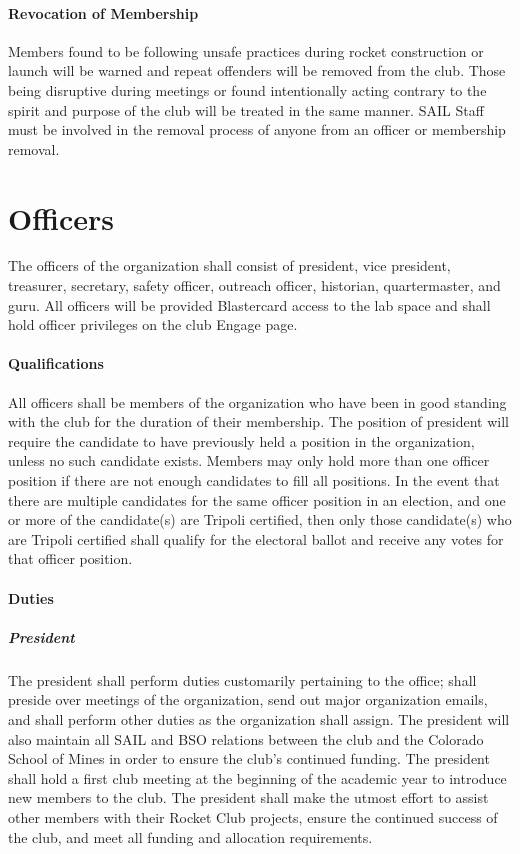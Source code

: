 \documentclass[12pt]{article}
\begin{document}
\paragraph{Revocation of Membership}
Members found to be following unsafe practices during rocket construction or launch will be warned and repeat offenders will be removed from the club.  
Those being disruptive during meetings or found intentionally acting contrary to the spirit and purpose of the club will be treated in the same manner. 
SAIL Staff must be involved in the removal process of anyone from an officer or membership removal.


\section{Officers}
\label{officers}
The officers of the organization shall consist of president, 
vice president, 
treasurer,
secretary, 
safety officer, 
outreach officer, 
historian, 
quartermaster, 
and guru. 
All officers will be provided Blastercard access to the lab space and shall hold officer privileges on the club Engage page.

\paragraph{Qualifications}
All officers shall be members of the organization who have been in good standing with the club for the duration of their membership.  
The position of president will require the candidate to have previously held a position in the organization, 
unless no such candidate exists. 
Members may only hold more than one officer position if there are not enough candidates to fill all positions. 
In the event that there are multiple candidates for the same officer position in an election, 
and one or more of the candidate(s) are Tripoli certified, 
then only those candidate(s) who are Tripoli certified shall qualify for the electoral ballot and receive any votes for that officer position.

\paragraph{Duties}
\subparagraph{President} The president shall perform duties customarily pertaining to the office; 
shall preside over meetings of the organization, 
send out major organization emails, 
and shall perform other duties as the organization shall assign.  
The president will also maintain all SAIL and BSO relations between the club and the Colorado School of Mines in order to ensure the club's continued funding. 
The president shall hold a first club meeting at the beginning of the academic year to introduce new members to the club. 
The president shall make the utmost effort to assist other members with their Rocket Club projects, 
ensure the continued success of the club, and meet all funding and allocation requirements.
\end{document}
